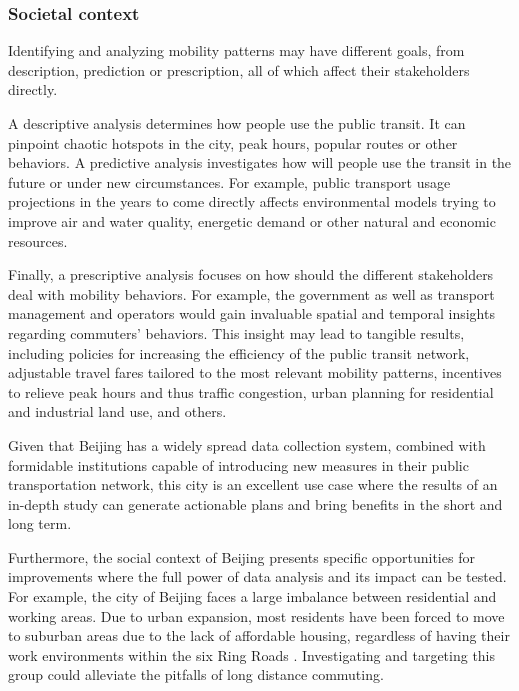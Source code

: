 \documentclass{article}
\begin{document}
\subsubsection{Societal context}
Identifying and analyzing mobility patterns may have different goals, from description, prediction or prescription, all of which affect their stakeholders directly. 

A descriptive analysis determines how people use the public transit. It can pinpoint chaotic hotspots in the city, peak hours, popular routes or other behaviors. A predictive analysis investigates how will people use the transit in the future or under new circumstances. For example, public transport usage projections in the years to come directly affects environmental models trying to improve air and water quality, energetic demand or other natural  and economic resources.

Finally, a prescriptive analysis focuses on how should the different stakeholders deal with mobility behaviors. For example, the government as well as transport management and operators would gain invaluable spatial and temporal insights regarding commuters' behaviors. This insight may lead to tangible results, including policies for increasing the efficiency of the public transit network, adjustable travel fares tailored to the most relevant mobility patterns, incentives to relieve peak hours and thus traffic congestion, urban planning for residential and industrial land use, and others.

Given that Beijing has a widely spread data collection system, combined with formidable institutions capable of introducing new measures in their public transportation network, this city is an excellent use case where the results of an in-depth study can generate actionable plans and bring benefits in the short and long term.

Furthermore, the social context of Beijing presents specific opportunities for improvements where the full power of data analysis and its impact can be tested. For example, the city of Beijing faces a large imbalance between residential and working areas. Due to urban expansion, most residents have been forced to move to suburban areas due to the lack of affordable housing, regardless of having their work environments within the six Ring Roads \cite{zhou2014commuting}. Investigating and targeting this group could alleviate the pitfalls of long distance commuting. 
\end{document}
